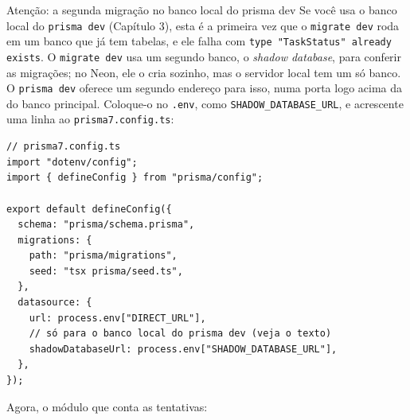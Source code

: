 \begin{destaque}{Atenção: a segunda migração no banco local do prisma dev}
Se você usa o banco local do \texttt{prisma dev} (Capítulo 3), esta é a primeira vez que o \texttt{migrate dev} roda em um banco que já tem tabelas, e ele falha com \texttt{type "TaskStatus" already exists}. O \texttt{migrate dev} usa um segundo banco, o \textit{shadow database}, para conferir as migrações; no Neon, ele o cria sozinho, mas o servidor local tem um só banco. O \texttt{prisma dev} oferece um segundo endereço para isso, numa porta logo acima da do banco principal. Coloque-o no \texttt{.env}, como \texttt{SHADOW\_DATABASE\_URL}, e acrescente uma linha ao \texttt{prisma7.config.ts}:
\end{destaque}

\begin{codigo}
\begin{Verbatim}[breaklines=true, breaksymbolleft={}, fontsize=\footnotesize]
// prisma7.config.ts
import "dotenv/config";
import { defineConfig } from "prisma/config";

export default defineConfig({
  schema: "prisma/schema.prisma",
  migrations: {
    path: "prisma/migrations",
    seed: "tsx prisma/seed.ts",
  },
  datasource: {
    url: process.env["DIRECT_URL"],
    // só para o banco local do prisma dev (veja o texto)
    shadowDatabaseUrl: process.env["SHADOW_DATABASE_URL"],
  },
});
\end{Verbatim}
\end{codigo}

Agora, o módulo que conta as tentativas:

